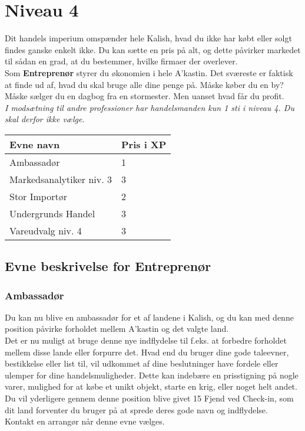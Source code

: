 \chapter{Niveau 4}
Dit handels imperium omspænder hele Kalish, hvad du ikke har købt eller solgt findes ganske enkelt ikke. Du kan sætte en pris på alt, og dette påvirker markedet til sådan en grad, at du bestemmer, hvilke firmaer der overlever.\\
Som \textbf{Entreprenør} styrer du økonomien i hele A'kastin. Det sværeste er faktisk at finde ud af, hvad du skal bruge alle dine penge på. Måske køber du en by? Måske sælger du en dagbog fra en stormester. Men uanset hvad får du profit.\\
\emph{I modsætning til andre professioner har handelsmanden kun 1 sti i niveau 4. Du skal derfor ikke vælge.}

\begin{table}[H]
    \centering
    \begin{tabular}{|p{}|p{}|}
    \rowcolor{cerulean!80}\hline
        Evne navn & Pris i XP \\\hline
        Ambassadør & 1\\\hline
        Markedsanalytiker niv. 3 & 3\\\hline
        Stor Importør & 2\\\hline
        Undergrunds Handel & 3\\\hline
        Vareudvalg niv. 4 & 3\\\hline
    \end{tabular}
\end{table}


\section{Evne beskrivelse for Entreprenør}

\subsection{Ambassadør}
Du kan nu blive en ambassadør for et af landene i Kalish, og du kan med denne position påvirke forholdet mellem A'kastin og det valgte land.\\
Det er nu muligt at bruge denne nye indflydelse til f.eks. at forbedre forholdet mellem disse lande eller forpurre det. Hvad end du bruger dine gode taleevner, bestikkelse eller list til, vil udkommet af dine beslutninger have fordele eller ulemper for dine handelsmuligheder. Dette kan indebære en prisstigning på nogle varer, mulighed for at købe et unikt objekt, starte en krig, eller noget helt andet.\\
Du vil yderligere gennem denne position blive givet 15 Fjend ved Check-in, som dit land forventer du bruger på at sprede deres gode navn og indflydelse.\\
Kontakt en arrangør når denne evne vælges.\\

